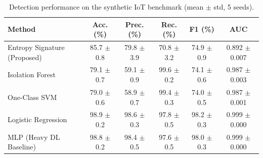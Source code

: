 \begin{table}[t]
\centering
\caption{Detection performance on the synthetic IoT benchmark (mean $\pm$ std, 5 seeds).}
\label{tab:iot}
\begin{tabular}{lccccc}
\toprule
Method & Acc. (\%) & Prec. (\%) & Rec. (\%) & F1 (\%) & AUC \\
\midrule
Entropy Signature (Proposed) & 85.7 $\pm$ 0.8 & 79.8 $\pm$ 3.9 & 70.8 $\pm$ 3.2 & 74.9 $\pm$ 0.9 & 0.892 $\pm$ 0.007 \\
Isolation Forest & 79.1 $\pm$ 0.7 & 59.1 $\pm$ 0.9 & 99.6 $\pm$ 0.2 & 74.1 $\pm$ 0.6 & 0.987 $\pm$ 0.003 \\
One-Class SVM & 79.0 $\pm$ 0.6 & 58.9 $\pm$ 0.7 & 99.4 $\pm$ 0.3 & 74.0 $\pm$ 0.5 & 0.987 $\pm$ 0.001 \\
Logistic Regression & 98.9 $\pm$ 0.2 & 98.6 $\pm$ 0.3 & 97.8 $\pm$ 0.5 & 98.2 $\pm$ 0.3 & 0.999 $\pm$ 0.000 \\
MLP (Heavy DL Baseline) & 98.8 $\pm$ 0.2 & 98.4 $\pm$ 0.5 & 97.6 $\pm$ 0.5 & 98.0 $\pm$ 0.3 & 0.999 $\pm$ 0.000 \\
\bottomrule
\end{tabular}
\end{table}